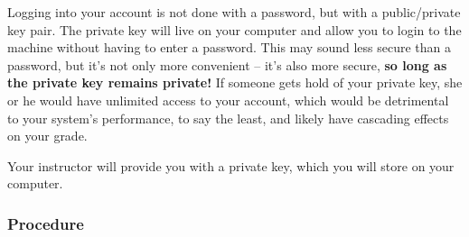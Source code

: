 \documentclass[11pt]{article} %
\begin{document}
Logging into your account is not done with a password, but with a public/private key pair. The private key will live on your computer and allow you to login to the machine without having to enter a password. This may sound less secure than a password, but it’s not only more convenient -- it’s also more secure, {\bf so long as the private key remains private!} If someone gets hold of your private key, she or he would have unlimited access to your account, which would be detrimental to your system’s performance, to say the least, and likely have cascading effects on your grade.

Your instructor will provide you with a private key, which you will store on your computer. 

\subsubsection*{Procedure}
\end{document}

